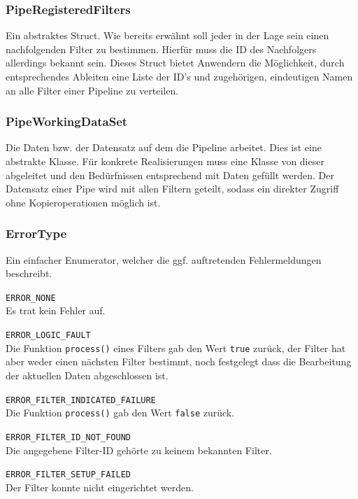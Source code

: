 \documentclass[12pt,a4paper,ngerman,enabledeprecatedfontcommands]{scrreprt}
\begin{document}
\subsubsection*{PipeRegisteredFilters}
Ein abstraktes Struct. Wie bereits erwähnt soll jeder in der Lage sein einen nachfolgenden Filter zu bestimmen. Hierfür muss die ID des Nachfolgers allerdings bekannt sein. Dieses Struct bietet Anwendern die Möglichkeit, durch entsprechendes Ableiten eine Liste der ID's und zugehörigen, eindeutigen Namen an alle Filter einer Pipeline zu verteilen.\\

\subsubsection*{PipeWorkingDataSet}
Die Daten bzw. der Datensatz auf dem die Pipeline arbeitet. Dies ist eine abstrakte Klasse. Für konkrete Realisierungen muss eine Klasse von dieser abgeleitet und den Bedürfnissen entsprechend mit Daten gefüllt werden. Der Datensatz einer Pipe wird mit allen Filtern geteilt, sodass ein direkter Zugriff ohne Kopieroperationen möglich ist.\\

\subsubsection*{ErrorType}
Ein einfacher Enumerator, welcher die ggf. auftretenden Fehlermeldungen beschreibt.
\begin{description}
\item \texttt{ERROR\_NONE} \\ Es trat kein Fehler auf.
\item \texttt{ERROR\_LOGIC\_FAULT} \\ Die Funktion \texttt{process()} eines Filters gab den Wert \texttt{true} zurück, der Filter hat aber weder einen nächsten Filter bestimmt, noch festgelegt dass die Bearbeitung der aktuellen Daten abgeschlossen ist.
\item \texttt{ERROR\_FILTER\_INDICATED\_FAILURE} \\ Die Funktion \texttt{process()} gab den Wert \texttt{false} zurück.
\item \texttt{ERROR\_FILTER\_ID\_NOT\_FOUND} \\ Die angegebene Filter-ID gehörte zu keinem bekannten Filter.
\item \texttt{ERROR\_FILTER\_SETUP\_FAILED} \\ Der Filter konnte nicht eingerichtet werden.\\
\end{description}
\end{document}
